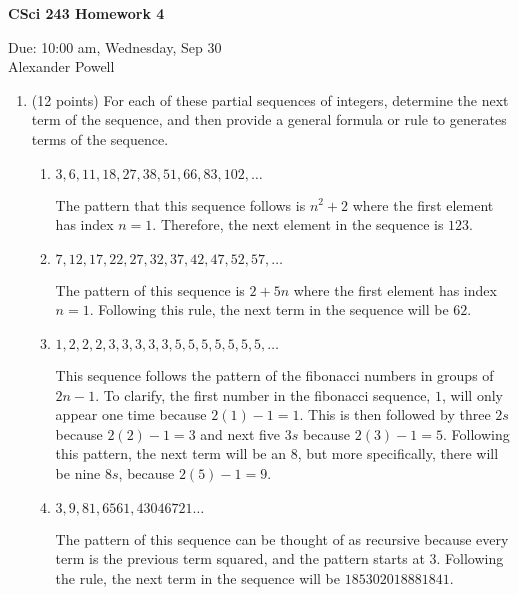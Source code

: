 \documentclass[11pt]{article}
\begin{document}
\begin{center}             %
\begin{LARGE}
{\bf CSci 243 Homework 4}
\end{LARGE}
\vskip 0.25cm      %

Due: 10:00 am, Wednesday, Sep 30 \\  %
Alexander Powell
\end{center}

\begin{enumerate}

\item (12 points)
For each of these partial sequences of integers, determine the next term of 
the sequence, and then provide a general formula or rule to generates terms of the
sequence.
\begin{enumerate}
\item $3, 6, 11, 18, 27, 38, 51, 66, 83, 102, \ldots$

The pattern that this sequence follows is $n^2 + 2$ where the first element has index $n = 1$.  Therefore, the next element in the sequence is $123$.  

\item $7, 12, 17, 22, 27, 32, 37, 42, 47, 52, 57, \ldots$

The pattern of this sequence is $2 + 5n$ where the first element has index $n = 1$.  Following this rule, the next term in the sequence will be $62$.  

\item $1, 2, 2, 2, 3, 3, 3, 3, 3, 5, 5, 5, 5, 5, 5, 5, \ldots$

This sequence follows the pattern of the fibonacci numbers in groups of $2n - 1$.  To clarify, the first number in the fibonacci sequence, $1$, will only appear one time because $2(1) - 1 = 1$.  This is then followed by three $2s$ because $2(2) - 1 = 3$ and next five $3s$ because $2(3) - 1 = 5$.  Following this pattern, the next term will be an $8$, but more specifically, there will be nine $8s$, because $2(5) - 1 = 9$.

\item $3, 9, 81, 6561, 43046721 \ldots$

The pattern of this sequence can be thought of as recursive because every term is the previous term squared, and the pattern starts at $3$.  Following the rule, the next term in the sequence will be $185302018881841$.  

\end{enumerate}


\end{enumerate}
\end{document}
